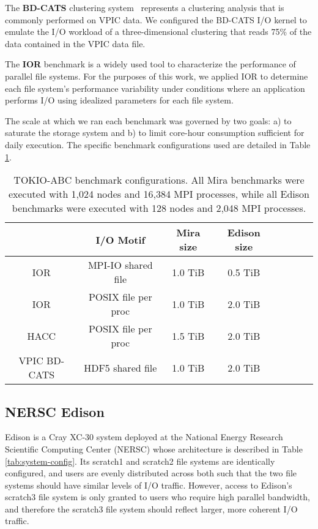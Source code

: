 The \textbf{BD-CATS} clustering system~\cite{Patwary2015} represents
a clustering analysis that is commonly performed on VPIC data.
We configured the BD-CATS I/O kernel to emulate the I/O workload of
a three-dimensional clustering that reads 75\% of the data
contained in the VPIC data file.

The \textbf{IOR} benchmark is a widely used tool
to characterize the performance of parallel file systems\cite{Yildiz2016,Xie2012,Lofstead2010,Uselton2010}.
For the purposes of this work, we applied IOR to determine each file system's performance variability under conditions where an application performs I/O using idealized parameters for each
file system.

The scale at which we ran each benchmark was governed by two goals:
a) to saturate the storage system and
b) to limit core-hour consumption sufficient for daily execution.
The specific benchmark configurations used are detailed in Table \ref{tab:bench-config}.

\begin{table}[h]
\footnotesize
\centering
\begin{tabular}{|c|c|c|c|c|c|c|c|}
\hline
 & \textbf{I/O Motif} & \textbf{Mira size} & \textbf{Edison size} \\
\hline
IOR & MPI-IO shared file & 1.0 TiB & 0.5 TiB\\
\hline
IOR & POSIX file per proc & 1.0 TiB & 2.0 TiB\\
\hline
HACC & POSIX file per proc & 1.5 TiB & 2.0 TiB \\
\hline
VPIC BD-CATS & HDF5 shared file & 1.0 TiB & 2.0 TiB\\
\hline
\end{tabular}
\caption{TOKIO-ABC benchmark configurations. All Mira benchmarks were
executed with 1,024 nodes and 16,384 MPI processes, while all Edison
benchmarks were executed with 128 nodes and 2,048 MPI processes.}
\label{tab:bench-config}
\normalsize
\vspace{-.4in}
\end{table}


\subsection{NERSC Edison} \label{sec:platforms/edison}

Edison is a Cray XC-30 system deployed at the National Energy Research Scientific Computing Center (NERSC) whose architecture is described in Table \ref{tab:system-config}.
Its scratch1 and scratch2 file systems are identically configured, and users are evenly distributed across both such that the two file systems should have similar levels of I/O traffic.
However, access to Edison's scratch3 file system is only granted to users who require high parallel bandwidth, and therefore the scratch3 file system should reflect larger, more coherent I/O traffic.

